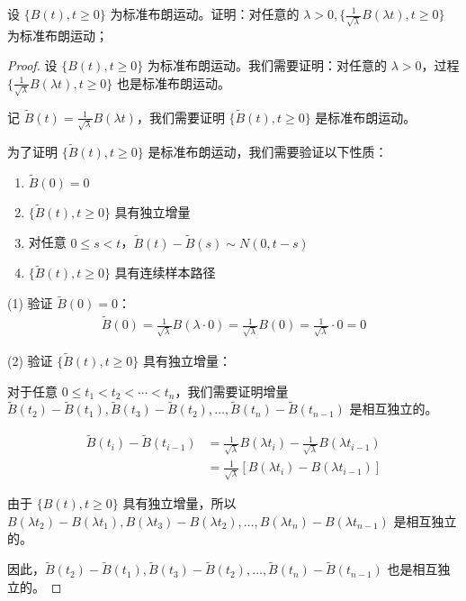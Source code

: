 \documentclass[lang=cn,10pt,thmcnt=section]{elegantbook}
\begin{document}
\begin{example}
	设 $\{B(t), t \geq 0\}$ 为标准布朗运动。证明：对任意的 $\lambda > 0, \{\frac{1}{\sqrt{\lambda}} B(\lambda t), t \geq 0\}$ 为标准布朗运动；
\end{example}
\begin{proof}
		设 $\{B(t), t \geq 0\}$ 为标准布朗运动。我们需要证明：对任意的 $\lambda > 0$，过程 $\{\frac{1}{\sqrt{\lambda}} B(\lambda t), t \geq 0\}$ 也是标准布朗运动。
		
		记 $\tilde{B}(t) = \frac{1}{\sqrt{\lambda}} B(\lambda t)$，我们需要证明 $\{\tilde{B}(t), t \geq 0\}$ 是标准布朗运动。
		
		为了证明 $\{\tilde{B}(t), t \geq 0\}$ 是标准布朗运动，我们需要验证以下性质：
		\begin{enumerate}
			\item $\tilde{B}(0) = 0$
			\item $\{\tilde{B}(t), t \geq 0\}$ 具有独立增量
			\item 对任意 $0 \leq s < t$，$\tilde{B}(t) - \tilde{B}(s) \sim N(0, t-s)$
			\item $\{\tilde{B}(t), t \geq 0\}$ 具有连续样本路径
		\end{enumerate}
		
		(1) 验证 $\tilde{B}(0) = 0$：
		\begin{align}
		\tilde{B}(0) = \frac{1}{\sqrt{\lambda}} B(\lambda \cdot 0) = \frac{1}{\sqrt{\lambda}} B(0) = \frac{1}{\sqrt{\lambda}} \cdot 0 = 0
		\end{align}
		
		(2) 验证 $\{\tilde{B}(t), t \geq 0\}$ 具有独立增量：
		
		对于任意 $0 \leq t_1 < t_2 < \cdots < t_n$，我们需要证明增量 $\tilde{B}(t_2) - \tilde{B}(t_1), \tilde{B}(t_3) - \tilde{B}(t_2), \ldots, \tilde{B}(t_n) - \tilde{B}(t_{n-1})$ 是相互独立的。
		
		\begin{align}
		\tilde{B}(t_i) - \tilde{B}(t_{i-1}) &= \frac{1}{\sqrt{\lambda}} B(\lambda t_i) - \frac{1}{\sqrt{\lambda}} B(\lambda t_{i-1}) \\
		&= \frac{1}{\sqrt{\lambda}} [B(\lambda t_i) - B(\lambda t_{i-1})]
		\end{align}
		
		由于 $\{B(t), t \geq 0\}$ 具有独立增量，所以 $B(\lambda t_2) - B(\lambda t_1), B(\lambda t_3) - B(\lambda t_2), \ldots, B(\lambda t_n) - B(\lambda t_{n-1})$ 是相互独立的。
		
		因此，$\tilde{B}(t_2) - \tilde{B}(t_1), \tilde{B}(t_3) - \tilde{B}(t_2), \ldots, \tilde{B}(t_n) - \tilde{B}(t_{n-1})$ 也是相互独立的。
		

\end{proof}
\end{document}
